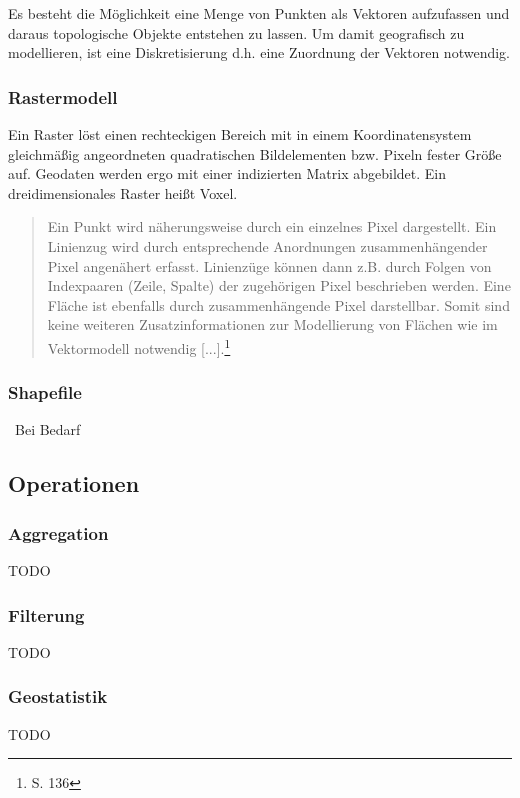 Es besteht die Möglichkeit eine Menge von Punkten als Vektoren aufzufassen und daraus topologische Objekte entstehen zu lassen.
Um damit geografisch zu modellieren, ist eine Diskretisierung d.h. eine Zuordnung der Vektoren notwendig. 

\subsubsection{Rastermodell}

Ein Raster löst einen rechteckigen Bereich mit in einem Koordinatensystem gleichmäßig angeordneten quadratischen Bildelementen bzw. Pixeln fester Größe auf.
Geodaten werden ergo mit einer indizierten Matrix abgebildet.
Ein dreidimensionales Raster heißt Voxel.
\begin{quote}
Ein Punkt wird näherungsweise durch ein einzelnes Pixel dargestellt. Ein Linienzug wird durch entsprechende Anordnungen zusammenhängender Pixel angenähert erfasst. Linienzüge können dann z.B. durch Folgen von Indexpaaren (Zeile, Spalte) der zugehörigen Pixel beschrieben werden. Eine Fläche ist ebenfalls durch zusammenhängende Pixel darstellbar. Somit sind keine weiteren Zusatzinformationen zur Modellierung von Flächen wie im Vektormodell notwendig [...].\footnote{\cite{book:gi-theopluspraxis3} S. 136}
\end{quote}


\subsubsection{Shapefile}\
Bei Bedarf

\subsection{Operationen}

\subsubsection{Aggregation}
TODO

\subsubsection{Filterung}
TODO

\subsubsection{Geostatistik}
TODO

